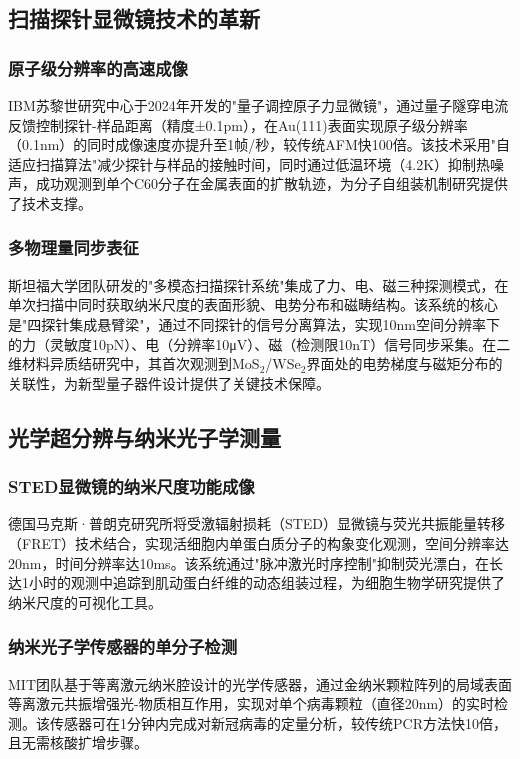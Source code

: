 \documentclass[lettersize,journal]{IEEEtran}
\begin{document}
	\subsection{扫描探针显微镜技术的革新}
	
	\subsubsection{原子级分辨率的高速成像}
	IBM苏黎世研究中心于2024年开发的"量子调控原子力显微镜"，通过量子隧穿电流反馈控制探针-样品距离（精度±0.1pm），在Au(111)表面实现原子级分辨率（0.1nm）的同时成像速度亦提升至1帧/秒，较传统AFM快100倍\cite{ibm2024quantum_afm}。该技术采用"自适应扫描算法"减少探针与样品的接触时间，同时通过低温环境（4.2K）抑制热噪声，成功观测到单个C60分子在金属表面的扩散轨迹，为分子自组装机制研究提供了技术支撑。
	
	\subsubsection{多物理量同步表征}
	斯坦福大学团队研发的"多模态扫描探针系统"集成了力、电、磁三种探测模式，在单次扫描中同时获取纳米尺度的表面形貌、电势分布和磁畴结构\cite{stanford2024multimodal_spm}。该系统的核心是"四探针集成悬臂梁"，通过不同探针的信号分离算法，实现10nm空间分辨率下的力（灵敏度10pN）、电（分辨率10μV）、磁（检测限10nT）信号同步采集。在二维材料异质结研究中，其首次观测到MoS$_2$/WSe$_2$界面处的电势梯度与磁矩分布的关联性，为新型量子器件设计提供了关键技术保障。
	
	\subsection{光学超分辨与纳米光子学测量}
	
	\subsubsection{STED显微镜的纳米尺度功能成像}
	德国马克斯·普朗克研究所将受激辐射损耗（STED）显微镜与荧光共振能量转移（FRET）技术结合，实现活细胞内单蛋白质分子的构象变化观测，空间分辨率达20nm，时间分辨率达10ms\cite{mpie2024sted_fret}。该系统通过"脉冲激光时序控制"抑制荧光漂白，在长达1小时的观测中追踪到肌动蛋白纤维的动态组装过程，为细胞生物学研究提供了纳米尺度的可视化工具。
	
	\subsubsection{纳米光子学传感器的单分子检测}
	MIT团队基于等离激元纳米腔设计的光学传感器，通过金纳米颗粒阵列的局域表面等离激元共振增强光-物质相互作用，实现对单个病毒颗粒（直径20nm）的实时检测\cite{mit2024plasmonic_sensor}。该传感器可在1分钟内完成对新冠病毒的定量分析，较传统PCR方法快10倍，且无需核酸扩增步骤。
	
\end{document}
